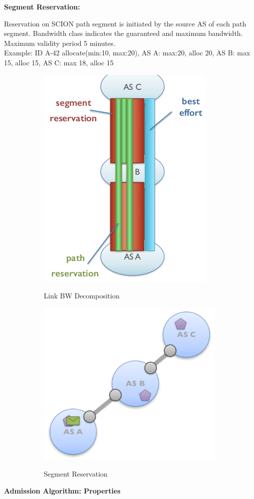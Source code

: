 \documentclass[11pt,oneside,a4paper]{article}
\begin{document}
\textbf{Segment Reservation:}

Reservation on SCION path segment is initiated by the source AS of each path segment. Bandwidth class indicates the guaranteed and maximum bandwidth. Maximum validity period 5 minutes.\\
Example: ID A-42 allocate(min:10, max:20), AS A: max:20, alloc 20, AS B: max 15, alloc 15, AS C: max 18, alloc 15

\begin{figure}[hb]
	\centering
	\begin{subfigure}[t]{.5\textwidth}
		\centering
		\includegraphics[width=0.4\linewidth]{figures/colibri_linkbw_decomp}
		\label{fig:colibri_linkbw_decomp}
		\caption{Link BW Decomposition}
	\end{subfigure}%
	\begin{subfigure}[t]{.5\textwidth}
		\centering
		\includegraphics[width=0.6\linewidth]{figures/colibri_segment_reservation}
		\label{fig:colibri_segment_reservation}
		\caption{Segment Reservation}
	\end{subfigure}
	\caption{}
\end{figure}

\textbf{Admission Algorithm: Properties}
\end{document}
